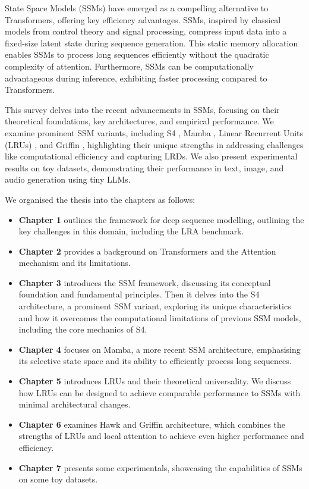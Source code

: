 \documentclass[12pt,a4paper]{report}
\begin{document}
\medskip

State Space Models (SSMs) have emerged as a compelling alternative to Transformers, offering key efficiency advantages. SSMs, inspired by classical models from control theory and signal processing, compress input data into a fixed-size latent state during sequence generation. This static memory allocation enables SSMs to process long sequences efficiently without the quadratic complexity of attention. Furthermore, SSMs can be computationally advantageous during inference, exhibiting faster processing compared to Transformers.

\medskip

This survey delves into the recent advancements in SSMs, focusing on their theoretical foundations, key architectures, and empirical performance. We examine prominent SSM variants, including S4 \cite{s4}, Mamba \cite{mamba}, Linear Recurrent Units (LRUs) \cite{lru}, and Griffin \cite{hawkgriffin}, highlighting their unique strengths in addressing challenges like computational efficiency and capturing LRDs. We also present experimental results on toy datasets, demonstrating their performance in text, image, and audio generation using tiny LLMs.

\medskip

We organised the thesis into the chapters as follows:
\begin{itemize}
    \item \textbf{Chapter 1} outlines the framework for deep sequence modelling, outlining the key challenges in this domain, including the LRA benchmark.
    \item \textbf{Chapter 2} provides a background on Transformers and the Attention mechanism and its limitations.
    \item \textbf{Chapter 3} introduces the SSM framework, discussing its conceptual foundation and fundamental principles. Then it delves into the S4 architecture, a prominent SSM variant, exploring its unique characteristics and how it overcomes the computational limitations of previous SSM models, including the core mechanics of S4.
    \item \textbf{Chapter 4} focuses on Mamba, a more recent SSM architecture, emphasising its selective state space and its ability to efficiently process long sequences.
    \item \textbf{Chapter 5} introduces LRUs and their theoretical universality. We discuss how LRUs can be designed to achieve comparable performance to SSMs with minimal architectural changes.
    \item \textbf{Chapter 6} examines Hawk and Griffin architecture, which combines the strengths of LRUs and local attention to achieve even higher performance and efficiency.
    \item \textbf{Chapter 7} presents some experimentals, showcasing the capabilities of SSMs on some toy datasets.
\end{itemize}
\end{document}
